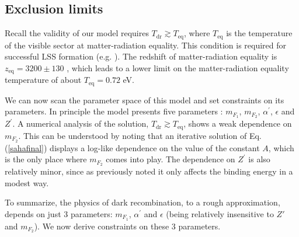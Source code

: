 \documentclass[12pt]{article}
\begin{document}
\subsection{Exclusion limits}
\vskip 0.3cm

Recall the validity of our model requires $T _{\text{dr}} \gtrsim T
_{\text{eq}}$, where $T _{\text{eq}}$ is the temperature of the visible
sector at matter-radiation equality. This condition is required for
successful LSS formation (e.g. \cite{volkaspetraki}). The redshift of
matter-radiation equality is $z _{\text{eq}} = 3200 \pm 130$ \cite{pdg},
which leads to a lower limit on the matter-radiation equality
temperature of about $T _{\text{eq}} = 0.72$ eV.

We can now scan the parameter space of this model and set constraints on
its parameters. In principle the model presents five parameters : $m
_{F_1}$, $m
_{F_2}$, $\alpha ^{'}$, $\epsilon$ and $Z ^{'}$. A numerical analysis of
the solution, $T _{\text{dr}} \gtrsim T _{\text{eq}}$, 
shows a weak dependence on $m _{F_2}$. This can be understood by noting
that an iterative solution of Eq.(\ref{sahafinal}) displays a log-like
dependence on the value of the constant $A$, which is the only place
where $m _{F_2}$ comes into play. The dependence on $Z ^{'}$ is also
relatively minor, since as previously noted it only affects the binding
energy in a modest way.

To summarize, the physics of dark recombination, to a rough
approximation, depends on just 3 parameters: $m _{F_1}$, $\alpha ^{'}$
and $\epsilon$ (being relatively insensitive to $Z'$ and $m _{F_2}$). We
now derive constraints on these 3 parameters.
\end{document}

